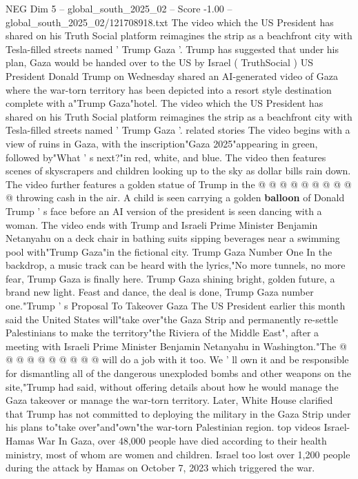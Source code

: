 \begin{textsample}{NEG Dim 5 – global\_south\_2025\_02 – Score -1.00 – global\_south\_2025\_02/121708918.txt}  \label{ex:f5_neg_243}
The video which the US President has shared on his Truth Social platform reimagines the strip as a beachfront city with Tesla-filled streets named ' Trump Gaza '.
Trump has suggested that under his plan, Gaza would be handed over to the US by Israel ( TruthSocial ) US President Donald Trump on Wednesday shared an AI-generated video of Gaza where the war-torn territory has been depicted into a resort style destination complete with a"Trump Gaza"hotel.
The video which the US President has shared on his Truth Social platform reimagines the strip as a beachfront city with Tesla-filled streets named ' Trump Gaza '. related stories The video begins with a view of ruins in Gaza, with the inscription"Gaza 2025"appearing in green, followed by"What ' s next?"in red, white, and blue.
The video then features scenes of skyscrapers and children looking up to the sky as dollar bills rain down.
The video further features a golden statue of Trump in the @ @ @ @ @ @ @ @ @ @ throwing cash in the air.
A child is seen carrying a golden \textbf{balloon} of Donald Trump ' s face before an AI version of the president is seen dancing with a woman.
The video ends with Trump and Israeli Prime Minister Benjamin Netanyahu on a deck chair in bathing suits sipping beverages near a swimming pool with"Trump Gaza"in the fictional city.
Trump Gaza Number One In the backdrop, a music track can be heard with the lyrics,"No more tunnels, no more fear, Trump Gaza is finally here.
Trump Gaza shining bright, golden future, a brand new light.
Feast and dance, the deal is done, Trump Gaza number one."Trump ' s Proposal To Takeover Gaza The US President earlier this month said the United States will"take over"the Gaza Strip and permanently re-settle Palestinians to make the territory"the Riviera of the Middle East", after a meeting with Israeli Prime Minister Benjamin Netanyahu in Washington."The @ @ @ @ @ @ @ @ @ @ will do a job with it too.
We ' ll own it and be responsible for dismantling all of the dangerous unexploded bombs and other weapons on the site,"Trump had said, without offering details about how he would manage the Gaza takeover or manage the war-torn territory.
Later, White House clarified that Trump has not committed to deploying the military in the Gaza Strip under his plans to"take over"and"own"the war-torn Palestinian region. top videos Israel-Hamas War In Gaza, over 48,000 people have died according to their health ministry, most of whom are women and children.
Israel too lost over 1,200 people during the attack by Hamas on October 7, 2023 which triggered the war.

\end{textsample}
